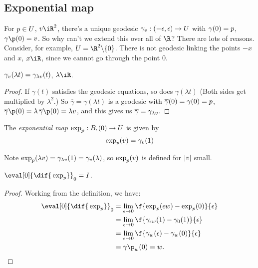 
	\pagebreak

\subsection{Exponential map} %
\label{sub:exponential_map}

\newcommand{\gvt}{\gamma_{\vv_\theta}}
\newcommand{\dGamma}{\dot{\Gamma}}

For $p\in U$, $\vv\iR^2$, there's a unique geodesic $\gamma_{v}:(-\epsilon,\epsilon) \to U$ with $\gamma(0)=p$, $\gamma\p(0)=\vv$. So why can't we extend this over all of $\R$? There are lots of reasons. Consider, for example, $U=\R^2\backslash\{0\}$. There is not geodesic linking the points $-x$ and $x$, $x\iR$, since we cannot go through the point $0$.

\begin{lemma}
	$\gamma_{v}(\lambda t) = \gamma_{\lambda v}(t)$, $\lambda\iR$.
\end{lemma}

\begin{proof}
	If $\gamma(t)$ satisfies the geodesic equations, so does $\gamma(\lambda t)$ (Both sides get multiplied by $\lambda^2$.) So $\overline{\gamma}=\gamma(\lambda t)$ is a geodesic with $\overline{\gamma}(0) = \gamma(0) = p$, $\overline{\gamma}\p(0) = \lambda\,\overline{\gamma}\p(0) = \lambda\vv$, and this gives us $\overline{\gamma} = \gamma_{\lambda v}$.
\end{proof}

\begin{definition}
	The \emph{exponential map} $\exp_{p}:B_\epsilon(0) \to U$ is given by
	\begin{equation*}
		\exp_{p}(v) = \gamma_{v}(1)
	\end{equation*}
\end{definition}

Note $\exp_{p}(\lambda v) = \gamma_{\lambda v}(1) = \gamma_{v}(\lambda)$, so $\exp_{p}(v)$ is defined for $|v|$ small.

\begin{proposition}
	$\eval[0]{\dif{\,\exp_\pp}}_0 = I$.
\end{proposition}

\begin{proof}
	Working from the definition, we have:
	\begin{align*}
		\eval[0]{\dif{\,\exp_\pp}}_0
		&= \lim_{\epsilon\to 0} \f{\exp_p(\epsilon\ww)-\exp_p(0)}{\epsilon} \\
		&= \lim_{\epsilon\to 0} \f{\gamma_{\epsilon\ww}(1) - \gamma_0(1)}{\epsilon} \\
		&= \lim_{\epsilon\to 0} \f{\gamma_\ww(\epsilon) - \gamma_\ww(0)}{\epsilon} \\
		&= \gamma\p_\ww(0) = \ww. \qedhere
	\end{align*}
\end{proof}


